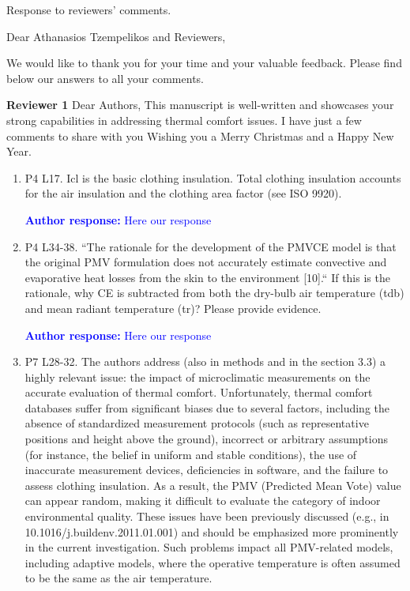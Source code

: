 \documentclass[a4paper, 10pt]{letter}
\newcommand{\response}[1]{\textcolor{blue}{\textbf{Author response:} #1}}
\begin{document}
    \begin{letter}
    {
        Response to reviewers' comments.
    }

        \opening{Dear Athanasios Tzempelikos and Reviewers,}


        We would like to thank you for your time and your valuable feedback.
        Please find below our answers to all your comments.

        \textbf{Reviewer 1}
        Dear Authors,
        This manuscript is well-written and showcases your strong capabilities in addressing thermal comfort issues.
        I have just a few comments to share with you Wishing you a Merry Christmas and a Happy New Year.

        \begin{enumerate}

            \item P4 L17.
            Icl is the basic clothing insulation.
            Total clothing insulation accounts for the air insulation and the clothing area factor (see ISO 9920).

            \response{
                Here our response
            }

            \item P4 L34-38.
            ``The rationale for the development of the PMVCE model is that the original PMV
            formulation does not accurately estimate convective and evaporative heat losses from
            the skin to the environment [10].`` If this is the rationale, why CE is subtracted from both
            the dry-bulb air temperature (tdb) and mean radiant temperature (tr)?
            Please provide evidence.

            \response{
                Here our response
            }

            \item P7 L28-32.
            The authors address (also in methods and in the section 3.3) a highly relevant issue: the impact of microclimatic measurements on the accurate evaluation of thermal comfort.
            Unfortunately, thermal comfort databases suffer from significant biases due to several factors, including the absence of standardized measurement protocols (such as representative positions and height above the ground), incorrect or arbitrary assumptions (for instance, the belief in uniform and stable conditions), the use of inaccurate measurement devices, deficiencies in software, and the failure to assess clothing insulation.
            As a result, the PMV (Predicted Mean Vote) value can appear random, making it difficult to evaluate the category of indoor environmental quality.
            These issues have been previously discussed (e.g., in 10.1016/j.buildenv.2011.01.001) and should be emphasized more prominently in the current investigation.
            Such problems impact all PMV-related models, including adaptive models, where the operative temperature is often assumed to be the same as the air temperature.


\end{enumerate}
\end{letter}
\end{document}
